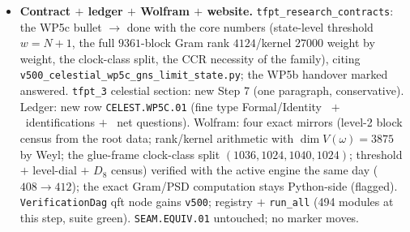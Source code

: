 \begin{itemize}[leftmargin=1.5em]
$c>0$ positivity forces $\omega(bb^*)\ge c$ --- no $w$-uniform damping state exists, the family
formulation is \emph{necessary} and the family \emph{exists}: the preregistered KILL is probed and
not triggered. \mC\ quasi-free extension to the full $*$-algebra; Kac positivity beyond level $2$.
\mO\ local normality, net structure/Haag duality (WP5d), Costello--Li (WP5e).
\item \textbf{Contract $+$ ledger $+$ Wolfram $+$ website.} \texttt{tfpt\_research\_contracts}: the
WP5c bullet $\to$ done with the core numbers (state-level threshold $w=N{+}1$, the full
$9361$-block Gram rank $4124$/kernel $27000$ weight by weight, the clock-class split, the CCR
necessity of the family), citing \texttt{v500\_celestial\_wp5c\_gns\_limit\_state.py}; the WP5b
handover marked answered. \texttt{tfpt\_3} celestial section: new Step 7 (one paragraph,
conservative). Ledger: new row \texttt{CELEST.WP5C.01} (fine type Formal/Identity \mE\ $+$ \mC\
identifications $+$ \mO\ net questions). Wolfram: four exact mirrors (level-2 block census from the
root data; rank/kernel arithmetic with $\dim V(\omega)=3875$ by Weyl; the glue-frame clock-class
split $(1036,1024,1040,1024)$; threshold $+$ level-dial $+$ $D_8$ census) verified with the active
engine the same day ($408\to412$); the exact Gram/PSD computation stays Python-side (flagged).
\texttt{VerificationDag} qft node gains \texttt{v500}; registry $+$ \texttt{run\_all} (494 modules
at this step, suite green). \texttt{SEAM.EQUIV.01} untouched; no marker moves.
\end{itemize}

